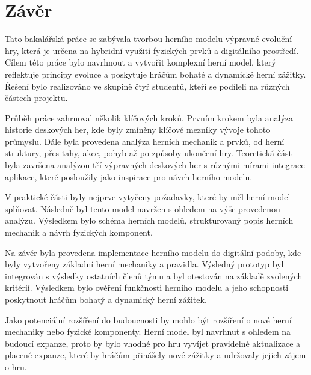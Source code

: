 \chapter{Závěr}

Tato bakalářská práce se zabývala tvorbou herního modelu výpravné evoluční hry, která je určena na hybridní využití fyzických prvků a digitálního prostředí. Cílem této práce bylo navrhnout a vytvořit komplexní herní model, který reflektuje principy evoluce a poskytuje hráčům bohaté a dynamické herní zážitky. Řešení bylo realizováno ve skupině čtyř studentů, kteří se podíleli na různých částech projektu.

Průběh práce zahrnoval několik klíčových kroků. Prvním krokem byla analýza historie deskových her, kde byly zmíněny klíčové mezníky vývoje tohoto průmyslu. Dále byla provedena analýza herních mechanik a prvků, od herní struktury, přes tahy, akce, pohyb až po způsoby ukončení hry. Teoretická část byla završena analýzou tří výpravných deskových her s různými mírami integrace aplikace, které posloužily jako inspirace pro návrh herního modelu.

V praktické části byly nejprve vytyčeny požadavky, které by měl herní model splňovat. Následně byl tento model navržen s ohledem na výše provedenou analýzu. Výsledkem bylo schéma herních modelů, strukturovaný popis herních mechanik a návrh fyzických komponent.

Na závěr byla provedena implementace herního modelu do digitální podoby, kde byly vytvořeny základní herní mechaniky a pravidla. Výsledný prototyp byl integrován s výsledky ostatních členů týmu a byl otestován na základě zvolených kritérií. Výsledkem bylo ověření funkčnosti herního modelu a jeho schopnosti poskytnout hráčům bohatý a dynamický herní zážitek.

Jako potenciální rozšíření do budoucnosti by mohlo být rozšíření o nové herní mechaniky nebo fyzické komponenty. Herní model byl navrhnut s ohledem na budoucí expanze, proto by bylo vhodné pro hru vyvíjet pravidelné aktualizace a placené expanze, které by hráčům přinášely nové zážitky a udržovaly jejich zájem o hru.

